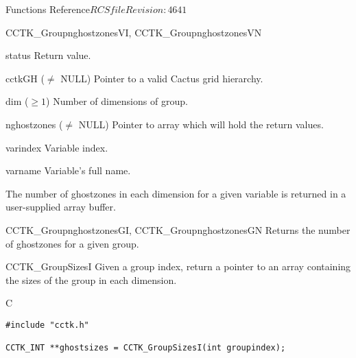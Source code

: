 \begin{cactuspart}{ Functions Reference}{$RCSfile$}{$Revision: 4641 $}
\begin{FunctionDescription}{CCTK\_GroupnghostzonesVI, CCTK\_GroupnghostzonesVN}
\begin{ParameterSection}
\begin{Parameter}{status} Return value. \end{Parameter}
\begin{Parameter}{cctkGH ($\ne$ NULL)} Pointer to a valid Cactus grid hierarchy. \end{Parameter}
\begin{Parameter}{dim ($\ge 1$)} Number of dimensions of group. \end{Parameter}
\begin{Parameter}{nghostzones ($\ne$ NULL)} Pointer to array which will hold the return values. \end{Parameter}
\begin{Parameter}{varindex} Variable index. \end{Parameter}
\begin{Parameter}{varname} Variable's full name. \end{Parameter}
\end{ParameterSection}

\begin{Discussion}
The number of ghostzones in each dimension for a given variable is returned in a user-supplied array buffer.
\end{Discussion}

\begin{SeeAlsoSection}
\begin{SeeAlso}{CCTK\_GroupnghostzonesGI, CCTK\_GroupnghostzonesGN}
Returns the number of ghostzones for a given group.
\end{SeeAlso}
\end{SeeAlsoSection}
\end{FunctionDescription}


\begin{FunctionDescription}{CCTK\_GroupSizesI}
\label{CCTK-GroupSizesI}
Given a group index, return a pointer to an array containing the sizes of the group in each dimension.

\begin{SynopsisSection}
\begin{Synopsis}{C}
\begin{verbatim}
#include "cctk.h"

CCTK_INT **ghostsizes = CCTK_GroupSizesI(int groupindex);
\end{verbatim}
\end{Synopsis}
\end{SynopsisSection}


\end{FunctionDescription}
\end{cactuspart}
